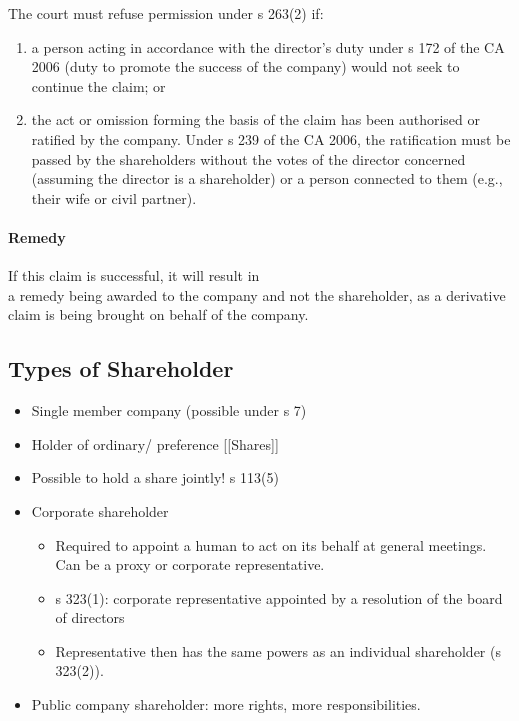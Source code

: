 \documentclass[
]{article}
\providecommand{\tightlist}{%
  \setlength{\itemsep}{0pt}\setlength{\parskip}{0pt}}
\begin{document}
The court must refuse permission under s 263(2) if:

\begin{enumerate}
\def\labelenumi{\arabic{enumi}.}
\tightlist
\item
  a person acting in accordance with the director's duty under s 172 of
  the CA 2006 (duty to promote the success of the company) would not
  seek to continue the claim; or
\item
  the act or omission forming the basis of the claim has been authorised
  or ratified by the company. Under s 239 of the CA 2006, the
  ratification must be passed by the shareholders without the votes of
  the director concerned (assuming the director is a shareholder) or a
  person connected to them (e.g., their wife or civil partner).
\end{enumerate}

\hypertarget{remedy-1}{%
\paragraph{Remedy}\label{remedy-1}}

If this claim is successful, it will result in\\
a remedy being awarded to the company and not the shareholder, as a
derivative claim is being brought on behalf of the company.

\hypertarget{types-of-shareholder}{%
\subsection{Types of Shareholder}\label{types-of-shareholder}}

\begin{itemize}
\tightlist
\item
  Single member company (possible under s 7)
\item
  Holder of ordinary/ preference {[}{[}Shares{]}{]}
\item
  Possible to hold a share jointly! s 113(5)
\item
  Corporate shareholder

  \begin{itemize}
  \tightlist
  \item
    Required to appoint a human to act on its behalf at general
    meetings. Can be a proxy or corporate representative.
  \item
    s 323(1): corporate representative appointed by a resolution of the
    board of directors
  \item
    Representative then has the same powers as an individual shareholder
    (s 323(2)).
  \end{itemize}
\item
  Public company shareholder: more rights, more responsibilities.
\end{itemize}
\end{document}
